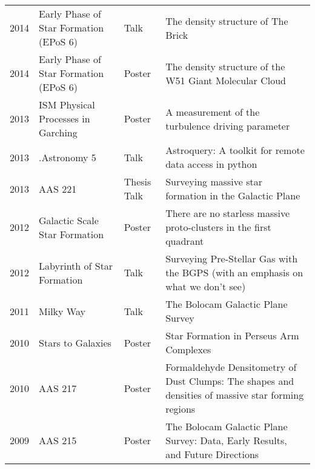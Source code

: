 \begin{tabular}{cp{1.8in}p{1.5cm}p{3.0in}}
    2014 &      Early Phase of Star Formation (EPoS 6)  & Talk & The density structure of The Brick \\
    2014 &      Early Phase of Star Formation (EPoS 6)  & Poster & The density structure of the W51 Giant Molecular Cloud \\
    2013 &      ISM Physical Processes in Garching  & Poster & A measurement of the turbulence driving parameter \\
    2013 &      .Astronomy 5  & Talk & Astroquery: A toolkit for remote data access in python \\
    2013 &      AAS 221  & Thesis Talk & Surveying massive star formation in the Galactic Plane \\
    2012 &      Galactic Scale Star Formation  & Poster& There are no starless massive proto-clusters in the first quadrant \\
    2012 &      Labyrinth of Star Formation  &  Talk& Surveying Pre-Stellar Gas with the BGPS (with an emphasis on what we don't see) \\
    2011 &      Milky Way  & Talk& The Bolocam Galactic Plane Survey \\
    2010 &      Stars to Galaxies  & Poster& Star Formation in Perseus Arm Complexes \\
    2010 &      AAS 217  &  Poster& Formaldehyde Densitometry of Dust Clumps: The shapes and densities of massive star forming regions \\
    2009 &      AAS 215  &  Poster& The Bolocam Galactic Plane Survey: Data, Early Results, and Future Directions \\
\end{tabular}

